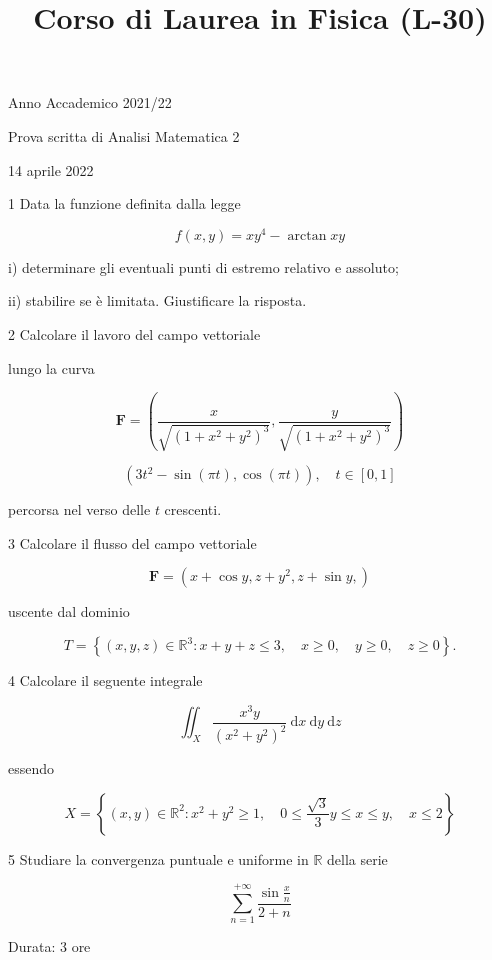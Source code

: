 \documentclass[10pt]{article}
\title{Corso di Laurea in Fisica (L-30) }
\author{}
\date{}
\begin{document}
\maketitle
Anno Accademico 2021/22

Prova scritta di Analisi Matematica 2

14 aprile 2022

1 Data la funzione definita dalla legge

\[
f(x, y)=x y^{4}-\arctan x y
\]

i) determinare gli eventuali punti di estremo relativo e assoluto;

ii) stabilire se è limitata. Giustificare la risposta.

2 Calcolare il lavoro del campo vettoriale

lungo la curva

\[
\mathbf{F}=\left(\frac{x}{\sqrt{\left(1+x^{2}+y^{2}\right)^{3}}}, \frac{y}{\sqrt{\left(1+x^{2}+y^{2}\right)^{3}}}\right)
\]

\[
\left(3 t^{2}-\sin (\pi t), \cos (\pi t)\right), \quad t \in[0,1]
\]

percorsa nel verso delle \(t\) crescenti.

3 Calcolare il flusso del campo vettoriale

\[
\mathbf{F}=\left(x+\cos y, z+y^{2}, z+\sin y,\right)
\]

uscente dal dominio

\[
T=\left\{(x, y, z) \in \mathbb{R}^{3}: x+y+z \leq 3, \quad x \geq 0, \quad y \geq 0, \quad z \geq 0\right\} .
\]

4 Calcolare il seguente integrale

\[
\iint_{X} \frac{x^{3} y}{\left(x^{2}+y^{2}\right)^{2}} \mathrm{~d} x \mathrm{~d} y \mathrm{~d} z
\]

essendo

\[
X=\left\{(x, y) \in \mathbb{R}^{2}: x^{2}+y^{2} \geq 1, \quad 0 \leq \frac{\sqrt{3}}{3} y \leq x \leq y, \quad x \leq 2\right\}
\]

5 Studiare la convergenza puntuale e uniforme in \(\mathbb{R}\) della serie

\[
\sum_{n=1}^{+\infty} \frac{\sin \frac{x}{n}}{2+n}
\]

Durata: 3 ore
\end{document}
